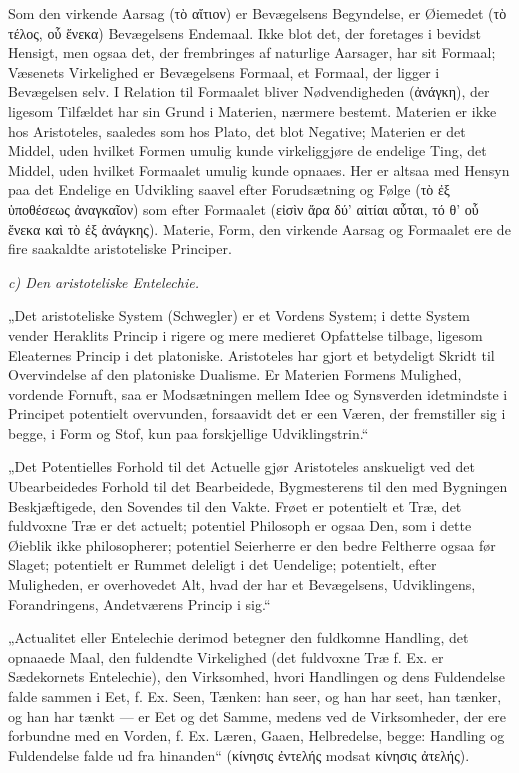 \documentclass[12pt]{book}
\newcommand{\opage}[1]{\marginnote{\footnotesize\textit{[#1]}}}
\begin{document}
Som den virkende Aarsag (τὸ αἴτιον) er Bevægelsens Begyndelse, er Øiemedet (τὸ τέλος, οὗ ἕνεκα)
Bevægelsens Endemaal. Ikke blot det, der foretages i bevidst Hensigt, men ogsaa det, der
frembringes af naturlige Aarsager, har sit Formaal; Væsenets Virkelighed er Bevægelsens Formaal,
et Formaal, der ligger i Bevægelsen selv. I Relation til Formaalet bliver Nødvendigheden (ἀνάγκη),
der ligesom Tilfældet har sin Grund i Materien, nærmere bestemt. Materien er ikke hos Aristoteles,
saaledes som hos Plato, det blot Negative; Materien er det Middel, uden hvilket Formen umulig
kunde virkeliggjøre de endelige Ting, det Middel, uden hvilket Formaalet umulig kunde opnaaes.
Her er altsaa med Hensyn paa det Endelige en Udvikling saavel efter Forudsætning og Følge (τὸ ἐξ
ὑποθέσεως ἀναγκαῖον) som efter Formaalet (εἰσὶν ἄρα δύ' αἰτίαι αὗται, τό θ' οὗ ἕνεκα καὶ τὸ ἐξ
ἀνάγκης). Materie, Form, den virkende Aarsag og Formaalet ere de fire saakaldte aristoteliske
Principer.

\emph{c) Den aristoteliske Entelechie.}

„Det aristoteliske System (Schwegler) er et Vordens System; i dette System vender Heraklits
Princip i rigere og mere medieret Opfattelse tilbage, ligesom Eleaternes Princip i det
platoniske. Aristoteles har gjort et betydeligt Skridt til Overvindelse af den platoniske
Dualisme. Er
\opage{144} Materien Formens Mulighed, vordende Fornuft, saa er Modsætningen mellem Idee og Synsverden
idetmindste i Principet potentielt overvunden, forsaavidt det er een Væren, der fremstiller sig i
begge, i Form og Stof, kun paa forskjellige Udviklingstrin.“

„Det Potentielles Forhold til det Actuelle gjør Aristoteles anskueligt ved det Ubearbeidedes
Forhold til det Bearbeidede, Bygmesterens til den med Bygningen Beskjæftigede, den Sovendes til
den Vakte. Frøet er potentielt et Træ, det fuldvoxne Træ er det actuelt; potentiel Philosoph er
ogsaa Den, som i dette Øieblik ikke philosopherer; potentiel Seierherre er den bedre Feltherre
ogsaa før Slaget; potentielt er Rummet deleligt i det Uendelige; potentielt, efter Muligheden, er
overhovedet Alt, hvad der har et Bevægelsens, Udviklingens, Forandringens, Andetværens Princip i
sig.“

„Actualitet eller Entelechie derimod betegner den fuldkomne Handling, det opnaaede Maal, den
fuldendte Virkelighed (det fuldvoxne Træ f. Ex. er Sædekornets Entelechie), den Virksomhed, hvori
Handlingen og dens Fuldendelse falde sammen i Eet, f. Ex. Seen, Tænken: han seer, og han har
seet, han tænker, og han har tænkt — er Eet og det Samme, medens ved de Virksomheder, der ere
forbundne med en Vorden, f. Ex. Læren, Gaaen, Helbredelse, begge: Handling og Fuldendelse falde
ud fra hinanden“ (κίνησις ἐντελής modsat κίνησις ἀτελής).
\end{document}

